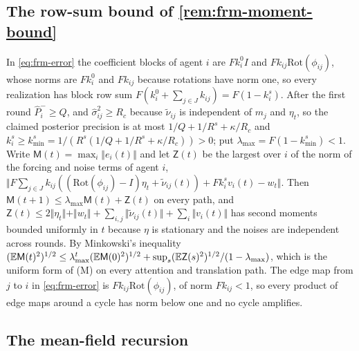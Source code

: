 \subsection*{The row-sum bound of \texorpdfstring{\cref{rem:frm-moment-bound}}{the moment-bound remark}}

In \eqref{eq:frm-error} the coefficient blocks of agent $i$ are $Fk^0_iI$ and $Fk_{ij}\mathrm{Rot}(\phi_{ij})$, whose norms are $Fk^0_i$ and $Fk_{ij}$ because rotations have norm one, so every realization has block row sum $F(k^0_i+\sum_{j\in J}k_{ij})=F(1-k^s_i)$. After the first round $\hat P^-_i\ge Q$, and $\hat\sigma^2_{ij}\ge R_c$ because $\tilde\nu_{ij}$ is independent of $m_j$ and $\eta_t$, so the claimed posterior precision is at most $1/Q+1/R^s+\kappa/R_c$ and $k^s_i\ge k^s_{\min}=1/(R^s(1/Q+1/R^s+\kappa/R_c))>0$; put $\lambda_{\max}=F(1-k^s_{\min})<1$. Write $\mathsf M(t)=\max_i\Vert e_i(t)\Vert$ and let $\mathsf Z(t)$ be the largest over $i$ of the norm of the forcing and noise terms of agent $i$, $\Vert F\sum_{j\in J}k_{ij}((\mathrm{Rot}(\phi_{ij})-I)\eta_t+\tilde\nu_{ij}(t))+Fk^s_iv_i(t)-w_t\Vert$. Then $\mathsf M(t+1)\le\lambda_{\max}\mathsf M(t)+\mathsf Z(t)$ on every path, and $\mathsf Z(t)\le2\Vert\eta_t\Vert+\Vert w_t\Vert+\sum_{i,j}\Vert\tilde\nu_{ij}(t)\Vert+\sum_i\Vert v_i(t)\Vert$ has second moments bounded uniformly in $t$ because $\eta$ is stationary and the noises are independent across rounds. By Minkowski's inequality $(\mathbb{E}\mathsf M(t)^2)^{1/2}\le\lambda_{\max}^t(\mathbb{E}\mathsf M(0)^2)^{1/2}+\sup_s(\mathbb{E}\mathsf Z(s)^2)^{1/2}/(1-\lambda_{\max})$, which is the uniform form of (M) on every attention and translation path. The edge map from $j$ to $i$ in \eqref{eq:frm-error} is $Fk_{ij}\mathrm{Rot}(\phi_{ij})$, of norm $Fk_{ij}<1$, so every product of edge maps around a cycle has norm below one and no cycle amplifies.

\subsection*{The mean-field recursion}


